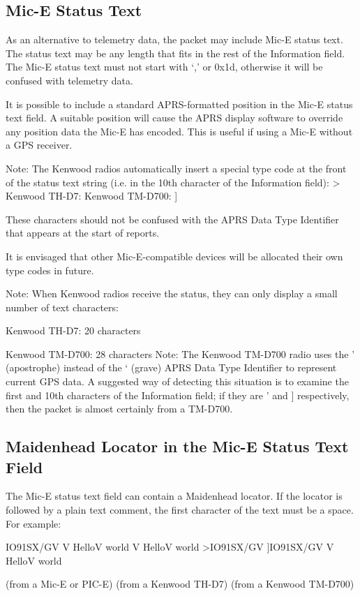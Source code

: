 \subsection{Mic-E Status Text}

As an alternative to telemetry data, the packet may include Mic-E status text.
The status text may be any length that fits in the rest of the Information field.
The Mic-E status text must not start with ‘,' or 0x1d, otherwise it will be
confused with telemetry data.

It is possible to include a standard APRS-formatted position in the Mic-E
status text field. A suitable position will cause the APRS display software to
override any position data the Mic-E has encoded. This is useful if using a
Mic-E without a GPS receiver.


Note: The Kenwood radios automatically insert a special type code at the
front of the status text string (i.e. in the 10th character of the Information
field):
>
Kenwood TH-D7:
Kenwood TM-D700: ]

These characters should not be confused with the APRS Data Type Identifier
that appears at the start of reports.

It is envisaged that other Mic-E-compatible devices will be allocated their
own type codes in future.

Note: When Kenwood radios receive the status, they can only display a small
number of text characters:

Kenwood TH-D7:
20 characters

Kenwood TM-D700: 28 characters
Note: The Kenwood TM-D700 radio uses the ' (apostrophe) instead of the ‘
(grave) APRS Data Type Identifier to represent current GPS data. A
suggested way of detecting this situation is to examine the first and 10th
characters of the Information field; if they are ' and ] respectively, then the
packet is almost certainly from a TM-D700.

\subsection{Maidenhead Locator in the Mic-E Status Text Field}

The Mic-E status text field can contain a Maidenhead locator.
If the locator is followed by a plain text comment, the first character of the
text must be a space. For example:

IO91SX/GV
V HelloV world
V HelloV world
>IO91SX/GV
]IO91SX/GV
V HelloV world

(from a Mic-E or PIC-E)
(from a Kenwood TH-D7)
(from a Kenwood TM-D700)


